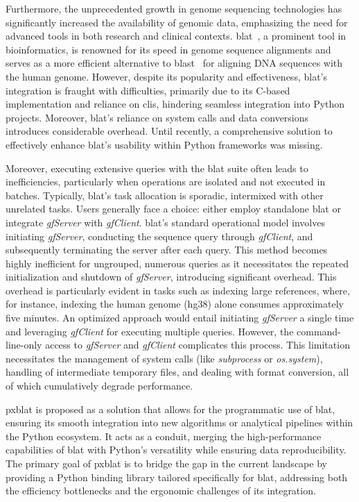\documentclass[10pt,letterpaper]{article}
\begin{document}
Furthermore, the unprecedented growth in genome sequencing technologies has significantly increased the availability of genomic data, emphasizing the need for advanced tools in both research and clinical contexts.
\gls{blat}~\cite{kent2002blat}, a prominent tool in bioinformatics, is renowned for its speed in genome sequence alignments and serves as a more efficient alternative to \gls{blast}~\cite{altschul1990basic} for aligning DNA sequences with the human genome.
However, despite its popularity and effectiveness, \gls{blat}'s integration is fraught with difficulties, primarily due to its C-based implementation and reliance on \glspl{cli}, hindering seamless integration into Python projects.
Moreover, \gls{blat}'s reliance on system calls and data conversions introduces considerable overhead.
Until recently, a comprehensive solution to effectively enhance  \gls{blat}'s usability within Python frameworks was missing.

Moreover, executing extensive queries with the \gls{blat} suite often leads to inefficiencies, particularly when operations are isolated and not executed in batches.
Typically, \gls{blat}'s task allocation is sporadic, intermixed with other unrelated tasks.
Users generally face a choice: either employ standalone \gls{blat} or integrate \emph{gfServer} with \emph{gfClient}.
\gls{blat}'s standard operational model involves initiating \emph{gfServer}, conducting the sequence query through \emph{gfClient}, and subsequently terminating the server after each query.
This method becomes highly inefficient for ungrouped, numerous queries as it necessitates the repeated initialization and shutdown of \emph{gfServer}, introducing significant overhead.
This overhead is particularly evident in tasks such as indexing large references, where, for instance, indexing the human genome (hg38) alone consumes approximately five minutes.
An optimized approach would entail initiating \emph{gfServer} a single time and leveraging \emph{gfClient} for executing multiple queries.
However, the command-line-only access to \emph{gfServer} and \emph{gfClient} complicates this process.
This limitation necessitates the management of system calls (like \emph{subprocess} or \emph{os.system}), handling of intermediate temporary files, and dealing with format conversion, all of which cumulatively degrade performance.

\gls{pxblat} is proposed as a solution that allows for the programmatic use of \gls{blat}, ensuring its smooth integration into new algorithms or analytical pipelines within the Python ecosystem.
It acts as a conduit, merging the high-performance capabilities of \gls{blat} with Python's versatility while ensuring data reproducibility.
The primary goal of \gls{pxblat} is to bridge the gap in the current landscape by providing a Python binding library tailored specifically for \gls{blat}, addressing both the efficiency bottlenecks and the ergonomic challenges of its integration.
\end{document}

